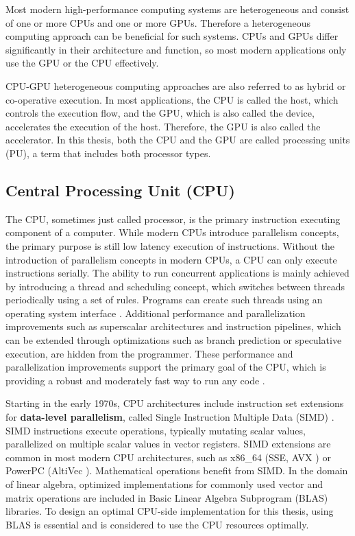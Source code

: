 Most modern high-performance computing systems are heterogeneous and consist of one or more CPUs and one or more GPUs. Therefore a heterogeneous computing approach can be beneficial for such systems. CPUs and GPUs differ significantly in their architecture and function, so most modern applications only use the GPU or the CPU effectively.

CPU-GPU heterogeneous computing approaches are also referred to as hybrid or co-operative execution. In most applications, the CPU is called the host, which controls the execution flow, and the GPU, which is also called the device, accelerates the execution of the host. Therefore, the GPU is also called the accelerator. In this thesis, both the CPU and the GPU are called processing units (PU), a term that includes both processor types.

\subsection{Central Processing Unit (CPU)}
The CPU, sometimes just called processor, is the primary instruction executing component of a computer. While modern CPUs introduce parallelism concepts, the primary purpose is still low latency execution of instructions.
Without the introduction of parallelism concepts in modern CPUs, a CPU can only execute instructions serially. The ability to run concurrent applications is mainly achieved by introducing a thread and scheduling concept, which switches between threads periodically using a set of rules. Programs can create such threads using an operating system interface \cite{nemirovskyMultithreadingArchitecture2013}.
Additional performance and parallelization improvements such as superscalar architectures and instruction pipelines, which can be extended through optimizations such as branch prediction or speculative execution, are hidden from the programmer. These performance and parallelization improvements support the primary goal of the CPU, which is providing a robust and moderately fast way to run any code \cite{johnsonSuperScalarProcessorDesign1989, falsafiPrimerHardwarePrefetching2014, smithStudyBranchPrediction1998}.

Starting in the early 1970s, CPU architectures include instruction set extensions for \textbf{data-level parallelism}, called Single Instruction Multiple Data (SIMD) \cite{barnesILLIACIVComputer1968,smartFullyHomomorphicSIMD2014, VectorExtensionsUsing}. SIMD instructions execute operations, typically mutating scalar values, parallelized on multiple scalar values in vector registers. SIMD extensions are common in most modern CPU architectures, such as x86\_64 (SSE, AVX \cite{IntelIntrinsicsGuide}) or PowerPC (AltiVec \cite{diefendorffAltiVecExtensionPowerPC2000}). Mathematical operations benefit from SIMD. In the domain of linear algebra, optimized implementations for commonly used vector and matrix operations are included in Basic Linear Algebra Subprogram (BLAS) \cite{lawsonBasicLinearAlgebra1979} libraries. To design an optimal CPU-side implementation for this thesis, using BLAS is essential and is considered to use the CPU resources optimally.

